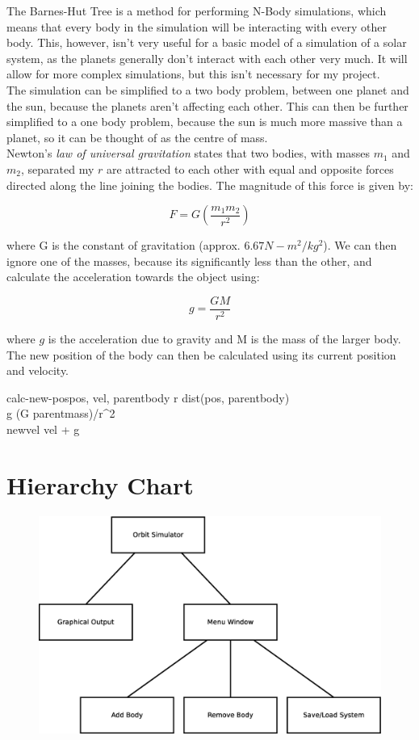The Barnes-Hut Tree is a method for performing N-Body simulations, which means
that every body in the simulation will be interacting with every other body.
This, however, isn't very useful for a basic model of a simulation of a solar
system, as the planets generally don't interact with each other very much. It
will allow for more complex simulations, but this isn't necessary for my
project. \\

The simulation can be simplified to a two body problem, between one planet and
the sun, because the planets aren't affecting each other. This can then be
further simplified to a one body problem, because the sun is much more massive
than a planet, so it can be thought of as the centre of mass. \\

Newton's \emph{law of universal gravitation} states that two bodies, with masses
$m_1$ and $m_2$, separated my $r$ are attracted to each other with equal and
opposite forces directed along the line joining the bodies. The magnitude of
this force is given by:

\begin{equation}
	F = G (\frac{m_1 m_2}{r^2})	
\end{equation}

where G is the constant of gravitation (approx. $6.67 N-m^2/kg^2$). We can then
ignore one of the masses, because its significantly less than the other, and
calculate the acceleration towards the object using:

\begin{equation}
	g = \frac{GM}{r^2}
\end{equation}

where $g$ is the acceleration due to gravity and M is the mass of the larger
body. The new position of the body can then be calculated using its current
position and velocity.

\begin{pseudocode}{calc-new-pos}{pos, vel, parentbody}
	r \GETS dist(pos, parentbody)	 \\
	g \GETS (G \cdot parentmass)/r^2 \\
	newvel \GETS vel + g \\
\end{pseudocode}

\section{Hierarchy Chart}

\begin{figure}[h]
	\includegraphics[width=\textwidth]{./img/hier.eps}
\end{figure}
